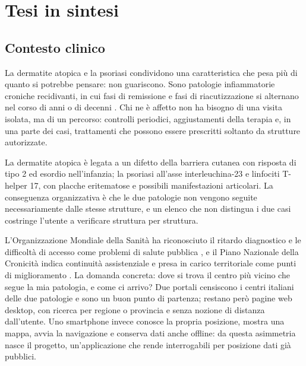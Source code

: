 \documentclass[a4paper, oneside, openright]{book}
\begin{document}
\hypersetup{pageanchor=false}
\frontmatter
\tableofcontents  %
\mainmatter
\hypersetup{pageanchor=true}
\setcounter{chapter}{1} %

\chapter*{Tesi in sintesi}\label{ch:sintesi}

\section{Contesto clinico}\label{sec:sintesi-contesto}

La dermatite atopica e la psoriasi condividono una caratteristica che pesa
pi\`u di quanto si potrebbe pensare: non guariscono.
Sono patologie infiammatorie croniche recidivanti, in cui fasi di remissione
e fasi di riacutizzazione si alternano nel corso di anni o di decenni
\cite{weidingerAD, griffithsPsoriasis}.
Chi ne \`e affetto non ha bisogno di una visita isolata, ma di un percorso:
controlli periodici, aggiustamenti della terapia e, in una parte dei casi,
trattamenti che possono essere prescritti soltanto da strutture autorizzate.

La dermatite atopica \`e legata a un difetto della barriera cutanea con
risposta di tipo 2 ed esordio nell'infanzia; la psoriasi all'asse
interleuchina-23 e linfociti T-helper 17, con placche eritematose e possibili
manifestazioni articolari.
La conseguenza organizzativa \`e che le due patologie non vengono seguite
necessariamente dalle stesse strutture, e un elenco che non distingua i due
casi costringe l'utente a verificare struttura per struttura.

L'Organizzazione Mondiale della Sanit\`a ha riconosciuto il ritardo
diagnostico e le difficolt\`a di accesso come problemi di salute pubblica
\cite{whoPsoriasis}, e il Piano Nazionale della Cronicit\`a indica
continuit\`a assistenziale e presa in carico territoriale come punti di
miglioramento \cite{pianoCronicita}.
La domanda concreta: dove si trova il centro pi\`u vicino che segue la mia
patologia, e come ci arrivo?
Due portali censiscono i centri italiani delle due patologie
\cite{dermatopia, viciniDiPelle} e sono un buon punto di partenza; restano
per\`o pagine web desktop, con ricerca per regione o provincia e senza
nozione di distanza dall'utente.
Uno smartphone invece conosce la propria posizione, mostra una mappa, avvia
la navigazione e conserva dati anche offline: da questa asimmetria nasce il
progetto, un'applicazione che rende interrogabili per posizione dati gi\`a
pubblici.
\end{document}
